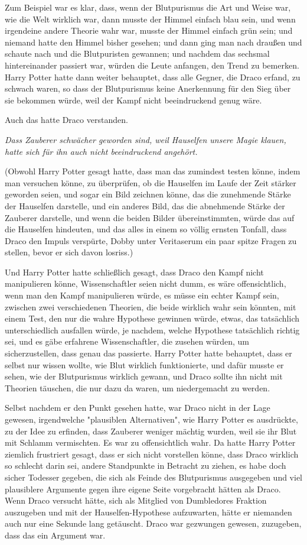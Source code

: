 {Zum Beispiel war es klar, dass, wenn der Blutpurismus die Art und Weise war, wie die Welt wirklich war, dann musste der Himmel einfach blau sein, und wenn irgendeine andere Theorie wahr war, musste der Himmel einfach grün sein; und niemand hatte den Himmel bisher gesehen; und dann ging man nach draußen und schaute nach und die Blutpuristen gewannen; und nachdem das sechsmal hintereinander passiert war, würden die Leute anfangen, den Trend zu bemerken. Harry Potter hatte dann weiter behauptet, dass alle Gegner, die Draco erfand, zu schwach waren, so dass der Blutpurismus keine Anerkennung für den Sieg über sie bekommen würde, weil der Kampf nicht beeindruckend genug wäre.

Auch das hatte Draco verstanden.

\emph{Dass Zauberer schwächer geworden sind, weil Hauselfen unsere Magie klauen, hatte sich für ihn auch nicht beeindruckend angehört.}

(Obwohl Harry Potter gesagt hatte, dass man das zumindest testen könne, indem man versuchen könne, zu überprüfen, ob die Hauselfen im Laufe der Zeit stärker geworden seien, und sogar ein Bild zeichnen könne, das die zunehmende Stärke der Hauselfen darstelle, und ein anderes Bild, das die abnehmende Stärke der Zauberer darstelle, und wenn die beiden Bilder übereinstimmten, würde das auf die Hauselfen hindeuten, und das alles in einem so völlig ernsten Tonfall, dass Draco den Impuls verspürte, Dobby unter Veritaserum ein paar spitze Fragen zu stellen, bevor er sich davon losriss.)

Und Harry Potter hatte schließlich gesagt, dass Draco den Kampf nicht manipulieren könne, Wissenschaftler seien nicht dumm, es wäre offensichtlich, wenn man den Kampf manipulieren würde, es müsse ein echter Kampf sein, zwischen zwei verschiedenen Theorien, die beide wirklich wahr sein könnten, mit einem Test, den nur die wahre Hypothese gewinnen würde, etwas, das tatsächlich unterschiedlich ausfallen würde, je nachdem, welche Hypothese tatsächlich richtig sei, und es gäbe erfahrene Wissenschaftler, die zusehen würden, um sicherzustellen, dass genau das passierte. Harry Potter hatte behauptet, dass er selbst nur wissen wollte, wie Blut wirklich funktionierte, und dafür musste er sehen, wie der Blutpurismus wirklich gewann, und Draco sollte ihn nicht mit Theorien täuschen, die nur dazu da waren, um niedergemacht zu werden.

Selbst nachdem er den Punkt gesehen hatte, war Draco nicht in der Lage gewesen, irgendwelche "plausiblen Alternativen", wie Harry Potter es ausdrückte, zu der Idee zu erfinden, dass Zauberer weniger mächtig wurden, weil sie ihr Blut mit Schlamm vermischten. Es war zu offensichtlich wahr. Da hatte Harry Potter ziemlich frustriert gesagt, dass er sich nicht vorstellen könne, dass Draco wirklich so schlecht darin sei, andere Standpunkte in Betracht zu ziehen, es habe doch sicher Todesser gegeben, die sich als Feinde des Blutpurismus ausgegeben und viel plausiblere Argumente gegen ihre eigene Seite vorgebracht hätten als Draco. Wenn Draco versucht hätte, sich als Mitglied von Dumbledores Fraktion auszugeben und mit der Hauselfen-Hypothese aufzuwarten, hätte er niemanden auch nur eine Sekunde lang getäuscht. Draco war gezwungen gewesen, zuzugeben, dass das ein Argument war.

}
